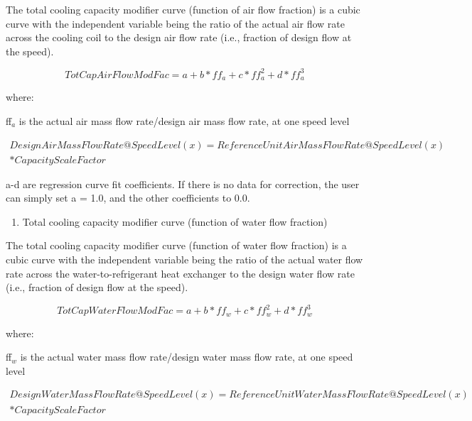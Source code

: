 The total cooling capacity modifier curve (function of air flow fraction) is a cubic curve with the independent variable being the ratio of the actual air flow rate across the cooling coil to the design air flow rate (i.e., fraction of design flow at the speed).

\begin{equation}
TotCapAirFlowModFac = a + b*f{f_a} + c*ff_a^2 + d*ff_a^3
\end{equation}

where:

ff\(_{a}\) is the actual air mass flow rate/design air mass flow rate, at one speed level

\begin{equation}
\begin{split}
  DesignAirMassFlowRate@SpeedLevel(x) = ReferenceUnitAirMassFlowRate@SpeedLevel(x) \\
  * CapacityScaleFactor
\end{split}
\end{equation}

a-d are regression curve fit coefficients.  If there is no data for correction, the user can simply set a = 1.0, and the other coefficients to 0.0.

\begin{enumerate}
\def\labelenumi{\arabic{enumi})}
\setcounter{enumi}{2}
\item Total cooling capacity modifier curve (function of water flow fraction)
\end{enumerate}

The total cooling capacity modifier curve (function of water flow fraction) is a cubic curve with the independent variable being the ratio of the actual water flow rate across the water-to-refrigerant heat exchanger to the design water flow rate (i.e., fraction of design flow at the speed).

\begin{equation}
TotCapWaterFlowModFac = a + b*f{f_w} + c*ff_w^2 + d*ff_w^3
\end{equation}

where:

ff\(_{w}\) is the actual water mass flow rate/design water mass flow rate, at one speed level

\begin{equation}
\begin{split}
  DesignWaterMassFlowRate@SpeedLevel(x) = ReferenceUnitWaterMassFlowRate@SpeedLevel(x) \\
  * CapacityScaleFactor
\end{split}
\end{equation}

